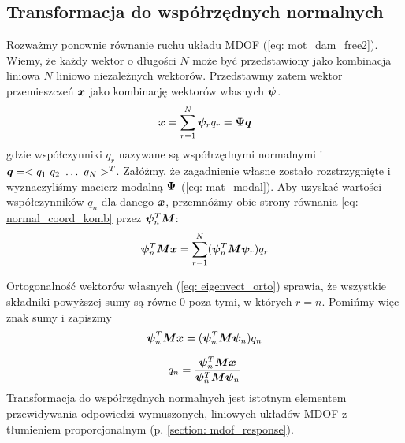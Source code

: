 \subsection{Transformacja do współrzędnych normalnych} \label{section: transform_normal}
Rozważmy ponownie równanie ruchu układu MDOF (\ref{eq: mot_dam_free2}). Wiemy, że każdy wektor o długości $N$ może być przedstawiony jako kombinacja liniowa $N$ liniowo niezależnych wektorów. Przedstawmy zatem wektor przemieszczeń $\bm{x}$ jako kombinację wektorów własnych $\bm{\psi}$.
\begin{equation} \label{eq: normal_coord_komb}
	\bm{x} = \sum_{r=1}^{N} \bm{\psi}_r q_r=\bm{\Psi q}
\end{equation} 
gdzie współczynniki $q_r$ nazywane są współrzędnymi normalnymi  i $\bm{q}=<q_1\,\,q_2\,\, \dots\,\, q_N>^T$. Załóżmy, że zagadnienie własne zostało rozstrzygnięte i wyznaczyliśmy macierz modalną $\bm{\Psi}$ (\ref{eq: mat_modal}). Aby uzyskać wartości współczynników $q_n$ dla danego $\bm{x}$, przemnóżmy obie strony równania \ref{eq: normal_coord_komb} przez $\bm{\psi}_n^T\bm{M}$:
\begin{equation} \label{eq: normal_coord_komb2}
	\bm{\psi}_n^T\bm{M}\bm{x} = \sum_{r=1}^{N} (\bm{\psi}_n^T\bm{M}\bm{\psi}_r) q_r
\end{equation} 

Ortogonalność wektorów własnych (\ref{eq: eigenvect_orto}) sprawia, że wszystkie składniki powyższej sumy są równe 0 poza tymi, w których $r=n$. Pomińmy więc znak sumy i zapiszmy 
\begin{equation} \label{eq: normal_coord_kom3}
	\bm{\psi}_n^T\bm{M}\bm{x} = (\bm{\psi}_n^T\bm{M}\bm{\psi}_n) q_n
\end{equation} 

\begin{equation} \label{eq: normal_coord_kom4}
	q_n = \frac{\bm{\psi}_n^T\bm{M}\bm{x}}{\bm{\psi}_n^T\bm{M}\bm{\psi}_n} 
\end{equation} 
Transformacja do współrzędnych normalnych jest istotnym elementem przewidywania odpowiedzi wymuszonych, liniowych układów MDOF z tłumieniem proporcjonalnym (p. \ref{section: mdof_response}).

